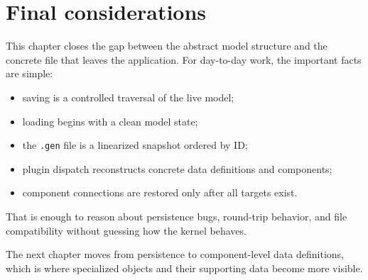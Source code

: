 \section{Final considerations}
\label{sec:model-persistence-final-considerations}

This chapter closes the gap between the abstract model structure and the
concrete file that leaves the application. For day-to-day work, the important
facts are simple:
\begin{itemize}
\item saving is a controlled traversal of the live model;
\item loading begins with a clean model state;
\item the \texttt{.gen} file is a linearized snapshot ordered by ID;
\item plugin dispatch reconstructs concrete data definitions and components;
\item component connections are restored only after all targets exist.
\end{itemize}

That is enough to reason about persistence bugs, round-trip behavior, and file
compatibility without guessing how the kernel behaves.

The next chapter moves from persistence to component-level data definitions,
which is where specialized objects and their supporting data become more
visible.
